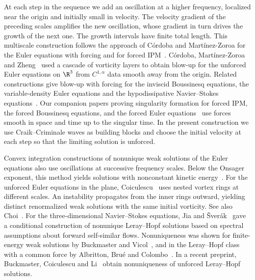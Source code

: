 At each step in the sequence we add an oscillation at a higher frequency, localized
near the origin and initially small in velocity. The velocity gradient
of the preceding scales amplifies the new oscillation, whose gradient
in turn drives the growth of the next one. The growth intervals have
finite total length. This multiscale construction follows the approach of C\'ordoba and
Mart\'inez-Zoroa for the Euler equations with forcing and for forced
IPM~\cite{CMZForcedEuler,CMZForcedIPM}.
C\'ordoba, Mart\'inez-Zoroa and Zheng~\cite{CMZUnforcedEuler} used a cascade of
vorticity layers to obtain blow-up for the unforced Euler equations
on $\R^3$ from $C^{1,\alpha}$ data
smooth away from the origin. Related constructions give blow-up with forcing
for the inviscid Boussinesq equations, the variable-density Euler equations
and the hypodissipative Navier--Stokes equations~\cite{CLMZForcedBoussinesq,CLMZNonhomogeneousEuler,CMZHypodissipativeNS}.
Our companion papers proving singularity formation for forced IPM,
the forced Boussinesq equations, and the forced Euler
equations~\cite{AlpogeBuckmasterCoiculescuIPM,AlpogeBuckmasterBoussinesq,AlpogeBuckmasterForcedEuler}
use forces smooth in space and time up to the singular time. In the
present construction we use Craik--Criminale waves as building blocks
and choose the initial velocity at each step so that the limiting
solution is unforced.

Convex integration constructions of nonunique weak solutions of the Euler equations
also use oscillations at successive frequency scales. Below the Onsager
exponent, this method yields solutions with nonconstant kinetic
energy~\cite{IsettOnsager,BDLSVOnsager}. For the unforced Euler equations
in the plane, Coiculescu~\cite{CoiculescuEulerI,CoiculescuEulerII}
uses nested vortex rings at different scales. An instability propagates
from the inner rings outward, yielding distinct renormalized weak
solutions with the same initial vorticity. See also Choi~\cite{ChoiEulerNonuniqueness}.
For the three-dimensional Navier--Stokes equations, Jia and
\v{S}ver\'ak~\cite{JiaSverak2015} gave a conditional construction of
nonunique Leray--Hopf solutions based
on spectral assumptions about forward self-similar flows.
Nonuniqueness was shown for
finite-energy weak solutions by Buckmaster and Vicol~\cite{BuckmasterVicolNS},
and in the Leray--Hopf class with a common force by Albritton, Bru\'e and
Colombo~\cite{AlbrittonBrueColombo}. In a recent preprint, Buckmaster,
Coiculescu and Li~\cite{BuckmasterCoiculescuLiNS} obtain nonuniqueness
of unforced Leray--Hopf solutions.

